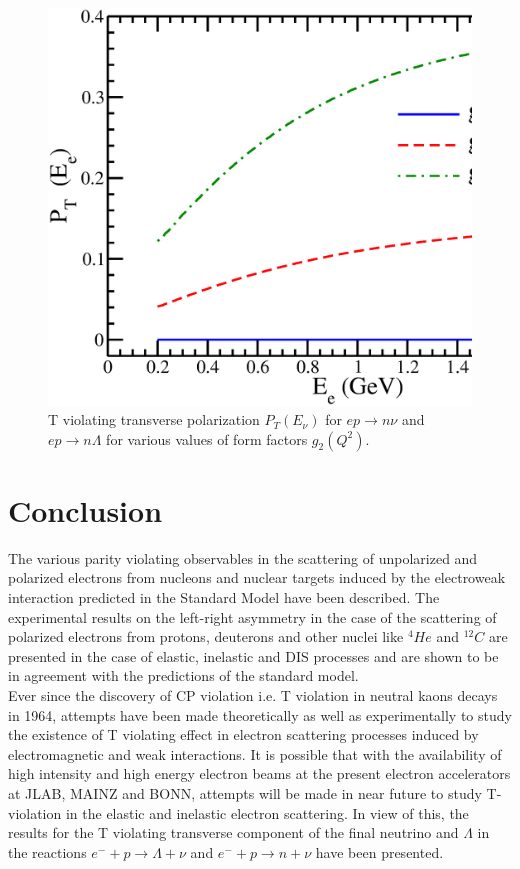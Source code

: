 \begin{figure}[H]
\centering
\includegraphics[scale=0.33]{src/images/chap9/lambda.eps}
\caption{T violating transverse polarization $P_T (E_\nu )$ for $ep  \to  n\nu$ and $ep \to  n \Lambda$ for various values of form factors $g_2 (Q^2)$.}\label{chap9-fig6}
\end{figure}


\section{Conclusion}\label{chap9-sec5}
The various parity violating observables in the scattering of unpolarized and polarized electrons from nucleons and nuclear targets induced  by the electroweak interaction predicted in the Standard Model have been described. The experimental results on the left-right asymmetry in the case of the scattering of polarized electrons from protons, deuterons  and other nuclei like $^4{He}$ and $^{12}{C}$ are presented in the case of elastic, inelastic and DIS processes and are shown to be in agreement with the predictions of the standard model.\\

Ever since the discovery of CP violation i.e. T violation in neutral kaons decays in 1964, attempts have been made theoretically as well as experimentally to study the existence of T violating effect  in electron scattering processes induced by electromagnetic and weak interactions. It is possible that with the availability of high intensity and high energy electron beams at the present electron accelerators at JLAB, MAINZ and BONN, attempts will be made in near future to study T-violation in the elastic and inelastic electron scattering. In view of this, the results for the T violating transverse component of the final neutrino and $\Lambda$ in the reactions $e^-+p\rightarrow \Lambda+\nu$ and $e^-+p\rightarrow n+\nu$ have been presented.
    

